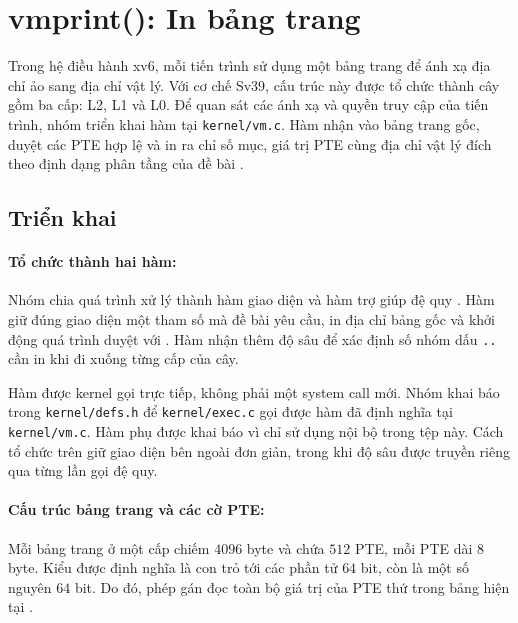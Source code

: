 \documentclass[a4paper]{article}
\renewcommand{\refname}{Tài liệu tham khảo}
\begin{document}
\renewcommand{\refname}{Tài liệu tham khảo}

\section{vmprint(): In bảng trang}

Trong hệ điều hành xv6, mỗi tiến trình sử dụng một bảng trang để ánh xạ
địa chỉ ảo sang địa chỉ vật lý. Với cơ chế Sv39, cấu trúc này được tổ chức
thành cây gồm ba cấp: L2, L1 và L0. Để quan sát các ánh xạ và quyền truy
cập của tiến trình, nhóm triển khai hàm 
tại \texttt{kernel/vm.c}. Hàm nhận vào bảng trang gốc, duyệt các PTE hợp lệ
và in ra chỉ số mục, giá trị PTE cùng địa chỉ vật lý đích theo định dạng
phân tầng của đề bài \cite{labguide,mitpgtbl}.

\subsection{Triển khai}

\paragraph*{Tổ chức thành hai hàm:}
Nhóm chia quá trình xử lý thành hàm giao diện  và hàm
trợ giúp đệ quy .
Hàm  giữ đúng giao diện một tham số mà đề bài yêu cầu,
in địa chỉ bảng gốc và khởi động quá trình duyệt với .
Hàm  nhận thêm độ sâu để xác định số nhóm dấu
\texttt{..} cần in khi đi xuống từng cấp của cây.

Hàm  được kernel gọi trực tiếp, không phải một system
call mới. Nhóm khai báo  trong
\texttt{kernel/defs.h} để \texttt{kernel/exec.c} gọi được hàm đã định
nghĩa tại \texttt{kernel/vm.c}. Hàm phụ được khai báo 
vì chỉ sử dụng nội bộ trong tệp này. Cách tổ chức trên giữ giao diện
bên ngoài đơn giản, trong khi độ sâu được truyền riêng qua từng
lần gọi đệ quy.


\paragraph*{Cấu trúc bảng trang và các cờ PTE:}
Mỗi bảng trang ở một cấp chiếm $4096$ byte và chứa $512$ PTE, mỗi PTE
dài $8$ byte. Kiểu  được định nghĩa là con trỏ tới
các phần tử $64$ bit, còn  là một số nguyên $64$ bit.
Do đó, phép gán  đọc toàn bộ giá trị
của PTE thứ  trong bảng hiện tại \cite{localsource}.
\end{document}
